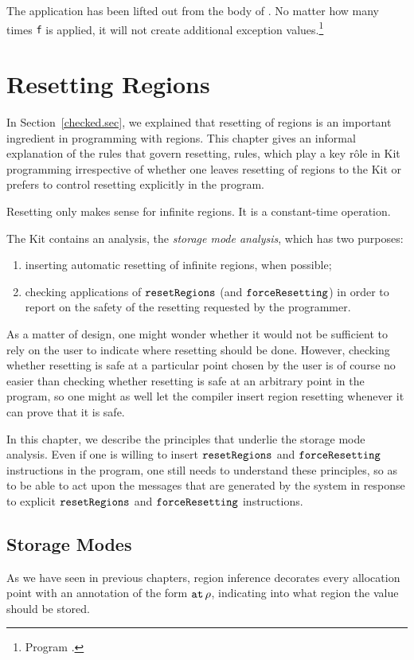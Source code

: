 \documentclass[12pt]{book}
\begin{document}
The application  has been lifted out from the body of
. No matter how many times {\tt f} is applied, it will not
create additional exception values.\footnote{Program
  .}

\chapter{Resetting Regions}
\label{storagemodes.sec}
In Section~\ref{checked.sec}, we explained that 
%
resetting of regions is an important ingredient in programming with
regions.
This chapter gives an informal explanation of the rules that
govern resetting, rules, which play a key r\^ole in Kit programming
irrespective of whether one leaves resetting of regions to the
Kit or prefers to control resetting explicitly in the program.


Resetting only makes sense for infinite regions. It is a 
constant-time operation.

The Kit contains an analysis, the {\em storage mode analysis}, which has
two purposes:
\begin{enumerate}
\item inserting automatic resetting of infinite regions, when possible;
\item checking applications of $\hbox{\tt resetRegions}$ (and $\hbox{\tt forceResetting}$) in order to 
report on the safety of the resetting requested by the programmer.
\end{enumerate}

As a matter of design, one might wonder whether it would not be sufficient
to rely on the user to indicate where resetting should be done. However,
checking whether resetting is safe at a particular point chosen
by the user is of course no easier than checking whether resetting is safe
at an arbitrary point in the program, so one might as well let the compiler
insert region resetting whenever it can prove that it is safe. 

In this chapter, we describe the principles that underlie the storage
mode analysis. Even if one is willing to insert $\hbox{\tt resetRegions}$ and
$\hbox{\tt forceResetting}$ instructions in the program, one still needs to understand
these principles, so as to be able to act upon the messages that are
generated by the system in response to explicit $\hbox{\tt resetRegions}$ and
$\hbox{\tt forceResetting}$ instructions.
%
\section{Storage Modes}
%
As we have seen in previous chapters, region inference decorates every
%
allocation point with an annotation of the form $\mathbin{\hbox{\tt at}}\,\rho$,
indicating into what region the value should be stored.
\end{document}
